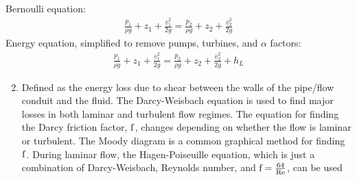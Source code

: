 \documentclass[letterpaper,10pt,english]{sphinxmanual}
\begin{document}
Bernoulli equation:
\begin{equation}\label{equation:Fluids_Review/Fluids_Review_Design:Fluids_Review/Fluids_Review_Design:31}
\begin{split}\frac{p_1}{\rho g} + {z_1} + \frac{\bar v_1^2}{2g} = \frac{p_2}{\rho g} + {z_2} + \frac{\bar v_2^2}{2g}\end{split}
\end{equation}
Energy equation, simplified to remove pumps, turbines, and \(\alpha\) factors:
\begin{equation}\label{equation:Fluids_Review/Fluids_Review_Design:Fluids_Review/Fluids_Review_Design:32}
\begin{split}\frac{p_{1}}{\rho g} + z_{1} + \frac{\bar v_{1}^2}{2g} = \frac{p_{2}}{\rho g} + z_{2} + \frac{\bar v_{2}^2}{2g} + h_L\end{split}
\end{equation}\begin{enumerate}
\setcounter{enumi}{1}
\item {} 
 Defined as the energy loss due to shear between the walls of the pipe/flow conduit and the fluid. The Darcy-Weisbach equation is used to find major losses in both laminar and turbulent flow regimes. The equation for finding the Darcy friction factor, \(\rm{f}\), changes depending on whether the flow is laminar or turbulent. The Moody diagram is a common graphical method for finding \(\rm{f}\). During laminar flow, the Hagen-Poiseuille equation, which is just a combination of Darcy-Weisbach, Reynolds number, and \({\rm{f}} = \frac{64}{\rm{Re}}\), can be used

\end{enumerate}
\end{document}
